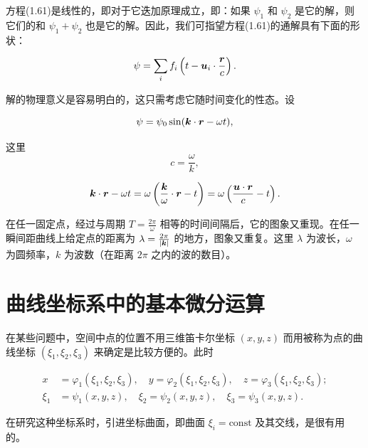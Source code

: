方程(1.61)是线性的，即对于它迭加原理成立，即：如果 $\psi_1$ 和 $\psi_2$ 是它的解，则它们的和 $\psi_1 + \psi_2$ 也是它的解。因此，我们可指望方程(1.61)的通解具有下面的形状：

\begin{equation*}
\psi = \sum_{i} f_i \left(t - \bm{u}_i \cdot \frac{\bm{r}}{c}\right).
\end{equation*}

解的物理意义是容易明白的，这只需考虑它随时间变化的性态。设

\begin{equation*}
\psi = \psi_0 \sin(\bm{k} \cdot \bm{r} - \omega t),
\end{equation*}

这里
\begin{equation*}
c = \frac{\omega}{k},
\end{equation*}

\begin{equation*}
\bm{k} \cdot \bm{r} - \omega t = \omega \left(\frac{\bm{k}}{\omega} \cdot \bm{r} - t\right) = \omega \left(\frac{\bm{u} \cdot \bm{r}}{c} - t\right).
\end{equation*}

在任一固定点，经过与周期 $T = \frac{2\pi}{\omega}$ 相等的时间间隔后，它的图象又重现。在任一瞬间距曲线上给定点的距离为 $\lambda = \frac{2\pi}{|\bm{k}|}$ 的地方，图象又重复。这里 $\lambda$ 为波长，$\omega$ 为圆频率，$k$ 为波数（在距离 $2\pi$ 之内的波的数目）。

\section{曲线坐标系中的基本微分运算}

在某些问题中，空间中点的位置不用三维笛卡尔坐标 $(x, y, z)$ 而用被称为点的曲线坐标 $(\xi_1, \xi_2, \xi_3)$ 来确定是比较方便的。此时

\begin{equation*}
\begin{aligned}
x &= \varphi_1(\xi_1, \xi_2, \xi_3), \quad y = \varphi_2(\xi_1, \xi_2, \xi_3), \quad z = \varphi_3(\xi_1, \xi_2, \xi_3);\\
\xi_1 &= \psi_1(x, y, z), \quad \xi_2 = \psi_2(x, y, z), \quad \xi_3 = \psi_3(x, y, z).
\end{aligned}
\end{equation*}

在研究这种坐标系时，引进坐标曲面，即曲面 $\xi_i = \text{const}$ 及其交线，是很有用的。

